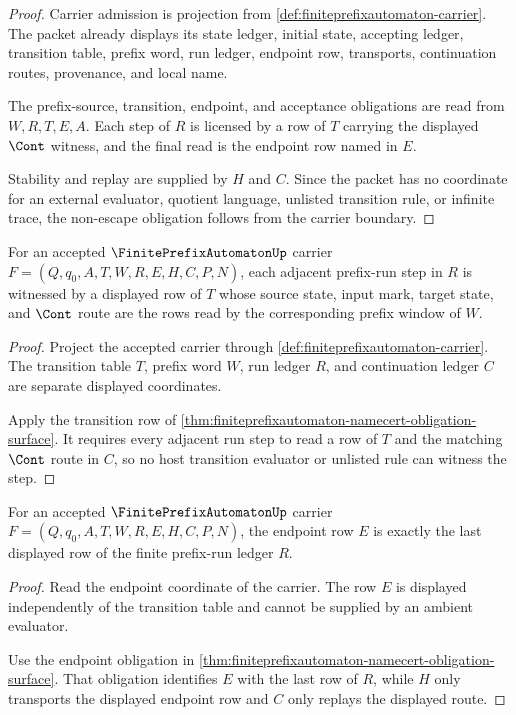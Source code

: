 \begin{proof}
Carrier admission is projection from \autoref{def:finiteprefixautomaton-carrier}. The packet already displays its state ledger, initial state, accepting ledger, transition table, prefix word, run ledger, endpoint row, transports, continuation routes, provenance, and local name.

The prefix-source, transition, endpoint, and acceptance obligations are read from $W,R,T,E,A$. Each step of $R$ is licensed by a row of $T$ carrying the displayed $\Cont$ witness, and the final read is the endpoint row named in $E$.

Stability and replay are supplied by $H$ and $C$. Since the packet has no coordinate for an external evaluator, quotient language, unlisted transition rule, or infinite trace, the non-escape obligation follows from the carrier boundary.
\end{proof}

\begin{theorem}
\label{thm:finiteprefixautomaton-transition-exactness-obligation}
For an accepted $\FinitePrefixAutomatonUp$ carrier $F=(Q,q_0,A,T,W,R,E,H,C,P,N)$, each adjacent prefix-run step in $R$ is witnessed by a displayed row of $T$ whose source state, input mark, target state, and $\Cont$ route are the rows read by the corresponding prefix window of $W$.
\end{theorem}
\begin{proof}
Project the accepted carrier through \autoref{def:finiteprefixautomaton-carrier}. The transition table $T$, prefix word $W$, run ledger $R$, and continuation ledger $C$ are separate displayed coordinates.

Apply the transition row of \autoref{thm:finiteprefixautomaton-namecert-obligation-surface}. It requires every adjacent run step to read a row of $T$ and the matching $\Cont$ route in $C$, so no host transition evaluator or unlisted rule can witness the step.
\end{proof}

\begin{theorem}
\label{thm:finiteprefixautomaton-endpoint-exactness-obligation}
For an accepted $\FinitePrefixAutomatonUp$ carrier $F=(Q,q_0,A,T,W,R,E,H,C,P,N)$, the endpoint row $E$ is exactly the last displayed row of the finite prefix-run ledger $R$.
\end{theorem}
\begin{proof}
Read the endpoint coordinate of the carrier. The row $E$ is displayed independently of the transition table and cannot be supplied by an ambient evaluator.

Use the endpoint obligation in \autoref{thm:finiteprefixautomaton-namecert-obligation-surface}. That obligation identifies $E$ with the last row of $R$, while $H$ only transports the displayed endpoint row and $C$ only replays the displayed route.
\end{proof}

